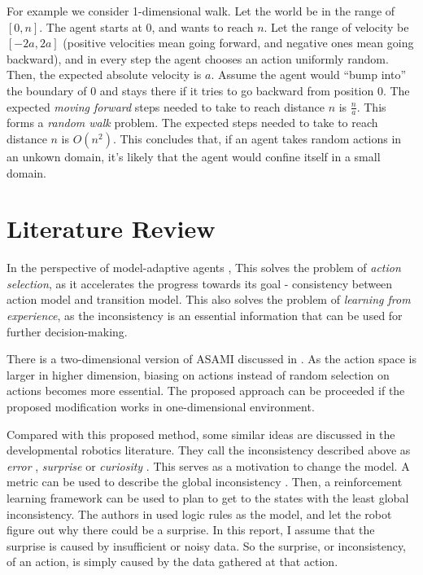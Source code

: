 \documentclass[10pt]{IEEEtran}
\begin{document}
For example we consider 1-dimensional walk. Let the world be in the
range of $[0,n]$. The agent starts at 0, and wants to reach $n$. Let
the range of velocity be $[-2a, 2a]$ (positive velocities mean going
forward, and negative ones mean going backward), and in every step the
agent chooses an action uniformly random.  Then, the expected absolute
velocity is $a$. Assume the agent would ``bump into'' the boundary of
$0$ and stays there if it tries to go backward from position $0$. The
expected \textit{moving forward} steps needed to take to reach
distance $n$ is $\frac{n}{a}$. This forms a \textit{random walk}
\cite{motwani1995randomized} problem. The expected steps needed to
take to reach distance $n$ is $O(n^2)$. This concludes that, if an
agent takes random actions in an unkown domain, it's likely that the
agent would confine itself in a small domain.

\section{Literature Review}

In the perspective of model-adaptive agents \cite{maes1993modeling},
This solves the problem of \textit{action selection}, as it
accelerates the progress towards its goal - consistency between action
model and transition model. This also solves the problem of
\textit{learning from experience}, as the inconsistency is an
essential information that can be used for further decision-making.

There is a two-dimensional version of ASAMI discussed in
\cite{ICRA08-stronger}.  As the action space is larger in higher
dimension, biasing on actions instead of random selection on actions
becomes more essential. The proposed approach can be proceeded if the
proposed modification works in one-dimensional environment.

Compared with this proposed method, some similar ideas are discussed
in the developmental robotics literature. They call the inconsistency
described above as \textit{error} \cite{oudeyer2006discovering},
\textit{surprise} \cite{ranasinghe2008surprise} or \textit{curiosity}
\cite{schmidhuber2006developmental}. This serves as a motivation to
change the model. A metric can be used to describe the global
inconsistency \cite{oudeyer2006discovering}. Then, a reinforcement
learning framework can be used to plan to get to the states with the
least global inconsistency. The authors in
\cite{ranasinghe2008surprise} used logic rules as the model, and let
the robot figure out why there could be a surprise. In this report, I
assume that the surprise is caused by insufficient or noisy data. So
the surprise, or inconsistency, of an action, is simply caused by the
data gathered at that action.
\end{document}
